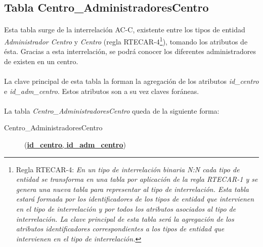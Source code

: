    \subsection{Tabla Centro\_AdministradoresCentro}

      \paragraph{}Esta tabla surge de la interrelación AC-C, existente entre
      los tipos de entidad \textit{Administrador Centro} y \textit{Centro}
      (regla RTECAR-4\footnote{Regla RTECAR-4: \textit{En un tipo de
      interrelación binaria N:N cada tipo de entidad se transforma en una tabla
      por aplicación de la regla RTECAR-1 y se genera una nueva tabla para
      representar al tipo de interrelación. Esta tabla estará formada por los
      identificadores de los tipos de entidad que intervienen en el tipo
      de interrelación y por todos los atributos asociados al tipo de
      interrelación. La clave principal de esta tabla será la agregación de los
      atributos identificadores correspondientes a los tipos de entidad que
      intervienen en el tipo de interrelación.}}), tomando los atributos de
      ésta. Gracias a esta interrelación, se podrá conocer los diferentes
      administradores de existen en un centro.

      \paragraph{}La clave principal de esta tabla la forman la agregación de
      los atributos \textit{id\_centro} e \textit{id\_adm\_centro}. Estos
      atributos son a su vez claves foráneas.

      \paragraph{}La tabla \textit{Centro\_AdministradoresCentro} queda de la
      siguiente forma:

      \begin{description}
         \item[Centro\_AdministradoresCentro] \begin{flushleft}(\underline{\textbf{id\_centro},
         \textbf{id\_adm\_centro}})\end{flushleft}
      \end{description}